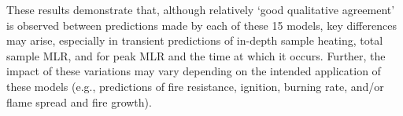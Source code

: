 \documentclass{article}
\begin{document}
 These results demonstrate that, although relatively `good qualitative agreement' is observed between predictions made by each of these 15 models, key differences may arise, especially in transient predictions of in-depth sample heating, total sample MLR, and for peak MLR and the time at which it occurs. Further, the impact of these variations may vary depending on the intended application of these models (e.g., predictions of fire resistance, ignition, burning rate, and/or flame spread and fire growth). 
 
 
 
 
 
\end{document}
